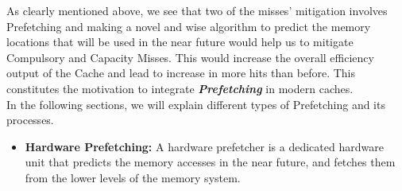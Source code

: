 \documentclass[12pt]{article}
\begin{document}
As clearly mentioned above, we see that two of the misses' mitigation involves Prefetching and making a novel and wise algorithm to predict the memory locations that will be used in the near future would help us to mitigate Compulsory and Capacity Misses. This would increase the overall efficiency output of the Cache and lead to increase in more hits than before. This constitutes the motivation to integrate \textbf{\textit{Prefetching}} in modern caches. \\

In the following sections, we will explain different types of Prefetching and its processes.
\begin{itemize}
    \item \textbf{Hardware Prefetching:} A hardware prefetcher is a dedicated hardware unit that predicts the memory accesses in the near future, and fetches them from the lower levels of the memory system. \\
    

\end{itemize}
\end{document}
